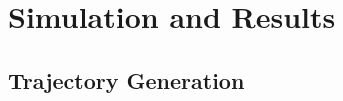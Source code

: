 \documentclass[main.tex]{subfiles}
\begin{document}
\section{Simulation and Results}\label{sec:simulation}

\subsection{Trajectory Generation}
\end{document}

